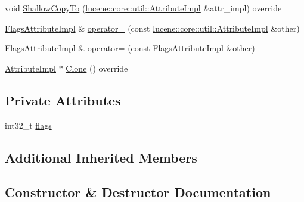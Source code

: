 \begin{DoxyCompactItemize}
\item 
void \mbox{\hyperlink{classlucene_1_1core_1_1analysis_1_1tokenattributes_1_1FlagsAttributeImpl_a9c6a676eb175556a2eea6afaae666f8d}{Shallow\+Copy\+To}} (\mbox{\hyperlink{classlucene_1_1core_1_1util_1_1AttributeImpl}{lucene\+::core\+::util\+::\+Attribute\+Impl}} \&attr\+\_\+impl) override
\item 
\mbox{\hyperlink{classlucene_1_1core_1_1analysis_1_1tokenattributes_1_1FlagsAttributeImpl}{Flags\+Attribute\+Impl}} \& \mbox{\hyperlink{classlucene_1_1core_1_1analysis_1_1tokenattributes_1_1FlagsAttributeImpl_a41dfb20fafc327e7832e639695b453fa}{operator=}} (const \mbox{\hyperlink{classlucene_1_1core_1_1util_1_1AttributeImpl}{lucene\+::core\+::util\+::\+Attribute\+Impl}} \&other)
\item 
\mbox{\hyperlink{classlucene_1_1core_1_1analysis_1_1tokenattributes_1_1FlagsAttributeImpl}{Flags\+Attribute\+Impl}} \& \mbox{\hyperlink{classlucene_1_1core_1_1analysis_1_1tokenattributes_1_1FlagsAttributeImpl_a32b03acbc1300103b4d96bd7e1a6ca2c}{operator=}} (const \mbox{\hyperlink{classlucene_1_1core_1_1analysis_1_1tokenattributes_1_1FlagsAttributeImpl}{Flags\+Attribute\+Impl}} \&other)
\item 
\mbox{\hyperlink{classlucene_1_1core_1_1util_1_1AttributeImpl}{Attribute\+Impl}} $\ast$ \mbox{\hyperlink{classlucene_1_1core_1_1analysis_1_1tokenattributes_1_1FlagsAttributeImpl_aa920978da58dffbf7eb16bfa5e5f84c4}{Clone}} () override
\end{DoxyCompactItemize}
\subsection*{Private Attributes}
\begin{DoxyCompactItemize}
\item 
int32\+\_\+t \mbox{\hyperlink{classlucene_1_1core_1_1analysis_1_1tokenattributes_1_1FlagsAttributeImpl_ac0a726a7b082414bcac0d9a5dc9ab4bb}{flags}}
\end{DoxyCompactItemize}
\subsection*{Additional Inherited Members}


\subsection{Constructor \& Destructor Documentation}
\mbox{\label{classlucene_1_1core_1_1analysis_1_1tokenattributes_1_1FlagsAttributeImpl_ac662a6d0887c9ffc42e3ef1ccc3f4256}} 
